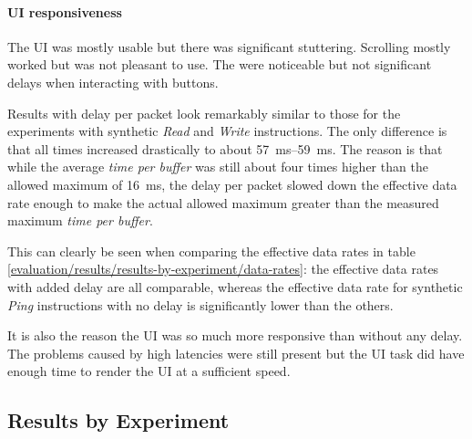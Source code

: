 \paragraph{UI responsiveness}

The UI was mostly usable but there was significant stuttering. Scrolling mostly worked but was not
pleasant to use. The were noticeable but not significant delays when interacting with buttons. 
\bigbreak

Results with delay per packet look remarkably similar to those for the experiments with synthetic
\textit{Read} and \textit{Write} instructions. The only difference is that all times increased
drastically to about \SIrange{57}{59}{\milli\second}. The reason is that while the average
\textit{time per buffer} was still about four times higher than the allowed maximum of
\SI{16}{\milli\second}, the delay per packet slowed down the effective data rate enough to make the
actual allowed maximum greater than the measured maximum \textit{time per buffer}.

This can clearly be seen when comparing the effective data rates in table \ref{evaluation/results/results-by-experiment/data-rates}:
the effective data rates with added delay are all comparable, whereas the effective data rate for
synthetic \textit{Ping} instructions with no delay is significantly lower than the others.

It is also the reason the UI was so much more responsive than without any delay. The problems caused
by high latencies were still present but the UI task did have enough time to render the UI at a
sufficient speed.

\clearpage
\subsection{Results by Experiment}
\label{evaluation/results/results-by-experiment}

